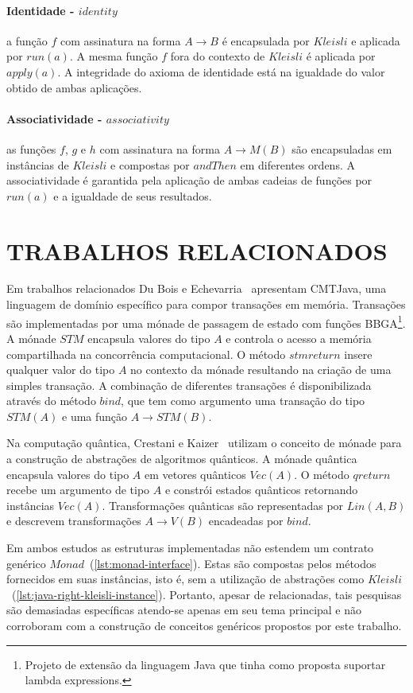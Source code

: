 \documentclass[10pt, conference]{IEEEtran}
\begin{document}
\paragraph{Identidade - $identity$} a função $f$ com assinatura na forma $A \rightarrow B$ é encapsulada por $Kleisli$ e aplicada por $run(a)$. A mesma função $f$ fora do contexto de $Kleisli$ é aplicada por $apply(a)$. A integridade do axioma de identidade está na igualdade do valor obtido de ambas aplicações.

\paragraph{Associatividade - $associativity$} as funções $f$, $g$ e $h$ com assinatura na forma $A \rightarrow M(B)$ são encapsuladas em instâncias de $Kleisli$ e compostas por $andThen$ em diferentes ordens. A associatividade é garantida pela aplicação de ambas cadeias de funções por $run(a)$ e a igualdade de seus resultados.

\section{TRABALHOS RELACIONADOS}
\label{sec:related-work}
Em trabalhos relacionados Du Bois e Echevarria~\cite{dubois2009domainspecific} apresentam CMTJava, uma linguagem de domínio específico para compor transações em memória. Transações são implementadas por uma mónade de passagem de estado com funções BBGA\footnote{Projeto de extensão da linguagem Java que tinha como proposta suportar lambda expressions.}. A mónade $STM$ encapsula valores do tipo $A$ e controla o acesso a memória compartilhada na concorrência computacional. O método $stmreturn$ insere qualquer valor do tipo $A$ no contexto da mónade resultando na criação de uma simples transação. A combinação de diferentes transações é disponibilizada através do método $bind$, que tem como argumento uma transação do tipo $STM(A)$ e uma função $A \rightarrow STM(B)$.

Na computação quântica, Crestani e Kaizer~\cite{crestani2013quantum} utilizam o conceito de mónade para a construção de abstrações de algoritmos quânticos. A mónade quântica encapsula valores do tipo $A$ em vetores quânticos $Vec(A)$. O método $qreturn$ recebe um argumento de tipo $A$ e constrói estados quânticos retornando instâncias $Vec(A)$. Transformações quânticas são representadas por $Lin(A, B)$ e descrevem transformações $A \rightarrow V(B)$ encadeadas por $bind$.

Em ambos estudos as estruturas implementadas não estendem um contrato genérico $Monad$~(\ref{lst:monad-interface}). Estas são compostas pelos métodos fornecidos em suas instâncias, isto é, sem a utilização de abstrações como $Kleisli$~(\ref{lst:java-right-kleisli-instance}). Portanto, apesar de relacionadas, tais pesquisas são demasiadas específicas atendo-se apenas em seu tema principal e não corroboram com a construção de conceitos genéricos propostos por este trabalho.
\end{document}
